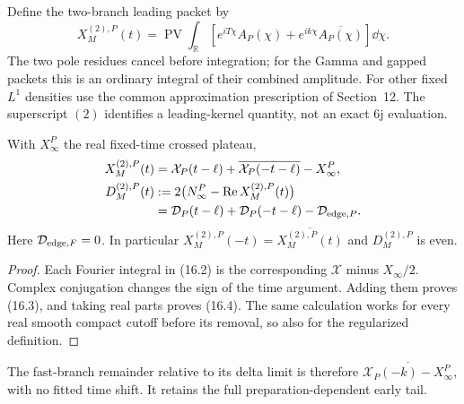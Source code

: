 Define the two-branch leading packet by
\begin{equation}
 X^{(2),P}_M(t)=\operatorname{PV}\int_{\mathbb R}
 \left[e^{iT\chi}A_P(\chi)
       +e^{ik\chi}\overline{A_P(\chi)}\right]\dd\chi.
 \label{eq:tb-definition}
\end{equation}
The two pole residues cancel before integration; for the Gamma and
gapped packets this is an ordinary integral of their combined amplitude.
For other fixed $L^1$ densities use the common approximation prescription
of Section~12. The superscript $(2)$ identifies a leading-kernel
quantity, not an exact 6j evaluation.
\begin{proposition}
With $X^P_\infty$ the real fixed-time crossed plateau,
\begin{align}
 X^{(2),P}_M(t)
 &=\mathcal X_P(t-\ell)+\overline{\mathcal X_P(-t-\ell)}-X^P_\infty,
 \label{eq:tb-mirror}\\
 D^{(2),P}_M(t)
 &:=2\bigl(N^P_\infty-\operatorname{Re}X^{(2),P}_M(t)\bigr)\notag\\
 &=\mathcal D_P(t-\ell)+\mathcal D_P(-t-\ell)
                         -\mathcal D_{{\rm edge},P}.
 \label{eq:tb-D}
\end{align}
Here $\mathcal D_{{\rm edge},F}=0$. In particular
$X^{(2),P}_M(-t)=\overline{X^{(2),P}_M(t)}$ and $D^{(2),P}_M$ is even.
\end{proposition}
\begin{proof}
Each Fourier integral in (16.2) is the corresponding $\mathcal X$
minus $X_\infty/2$. Complex conjugation changes the sign of the time
argument. Adding them proves (16.3), and taking real parts proves
(16.4). The same calculation works for every real smooth compact
cutoff before its removal, so also for the regularized definition.
\end{proof}
The fast-branch remainder relative to its delta limit is therefore
$\overline{\mathcal X_P(-k)-X^P_\infty}$, with no fitted time shift.
It retains the full preparation-dependent early tail.

